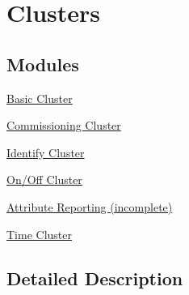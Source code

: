 \hypertarget{group__zcl__clusters}{\section{Clusters}
\label{group__zcl__clusters}
}
\subsection*{Modules}
\begin{DoxyCompactItemize}
\item 
\hyperlink{group__zcl__basic}{Basic Cluster}
\item 
\hyperlink{group__zcl__commissioning}{Commissioning Cluster}
\item 
\hyperlink{group__zcl__identify}{Identify Cluster}
\item 
\hyperlink{group__zcl__onoff}{On/\-Off Cluster}
\item 
\hyperlink{group__zcl__reporting}{Attribute Reporting (incomplete)}
\item 
\hyperlink{group__zcl__time}{Time Cluster}
\end{DoxyCompactItemize}


\subsection{Detailed Description}
